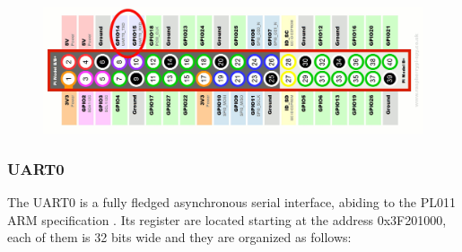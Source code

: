 \documentclass[12pt,a4paper,openright,twoside]{report}
\begin{document}
 \begin{figure}[t]
 \includegraphics[scale=0.143]{tesi2.jpg}
 \end{figure}

\subsubsection{UART0}
The UART0 is a fully fledged asynchronous serial interface, abiding to the 
PL011 ARM specification \cite{pl011}.
Its register are located starting at the address 0x3F201000, each of them
is 32 bits wide and they are organized as follows:
\end{document}
